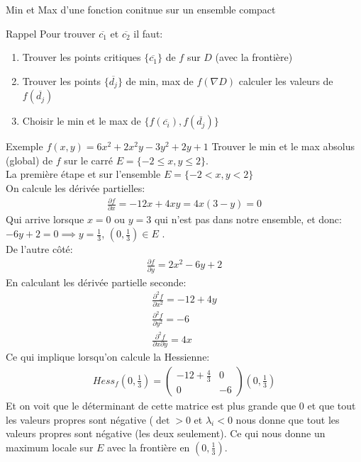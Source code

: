 \begin{parag}{Min et Max d'une fonction conitnue sur un ensemble compact}
\begin{subparag}{Rappel}
       Pour trouver $\overline{c_1}$ et $\overline{c_2}$ il faut:
       \begin{enumerate}
           \item Trouver les points critiques $\{\overline{c_1}\}$ de $f$ sur $D$ (avec la frontière)
           \item Trouver les points $\{\overline{d_j}\}$ de min, max de $f\left( \nabla D\right)$ calculer les valeurs de $f\left(\overline{d_j}\right)$
           \item Choisir le min et le max de $\{f\left(\overline{c_i}\right), f\left(\overline{d_j}\right)\}$
       \end{enumerate}
   \end{subparag} 
   \begin{subparag}{Exemple}
       $f\left(x, y\right) = 6x^2 + 2x^2y - 3y^2 + 2y + 1$ Trouver le min et le max absolus (global) de $f$ sur le carré $E = \{-2 \leq x, y \leq 2\}$.\\
       La première étape et sur l'ensemble $E = \{-2 < x, y < 2\}$ \\
       On calcule les dérivée partielles:
       \begin{align*} \frac{\partial f}{\partial x} = -12x + 4xy = 4x\left(3-y\right) = 0 \end{align*}
       Qui arrive lorsque $x = 0$ ou $y = 3$ qui n'est pas dans notre ensemble, et donc: $-6y + 2 = 0 \implies y = \frac{1}{3}$, $\left(0, \frac{1}{3}\right) \in E$ .\\
       De l'autre côté:
       \begin{align*} \frac{\partial f}{\partial y} = 2x^2 - 6y + 2 \end{align*}
       En calculant les dérivée partielle seconde:
       \begin{align*} \frac{\partial^2 f }{\partial x^2} = -12 + 4y\\
       \frac{\partial^2 f}{\partial y^2} = -6\\
        \frac{\partial^2 f}{\partial x \partial y} = 4x 
   \end{align*}
   Ce qui implique lorsqu'on calcule la Hessienne:
   \begin{align*} Hess_f\left(0, \frac{1}{3}\right) = \begin{pmatrix} -12 + \frac{4}{3} & 0 \\ 0 & -6 \end{pmatrix} \left(0, \frac{1}{3}\right) \end{align*}
   Et on voit que le déterminant de cette matrice est plus grande que $0$ et que tout les valeurs propres sont négative ($\det > 0$ et $\lambda_i < 0$ nous donne que tout les valeurs propres sont négative (les deux seulement). Ce qui nous donne un maximum locale sur $E$ avec la frontière en $\left(0, \frac{1}{3}\right)$.
       

\end{subparag}
\end{parag}
